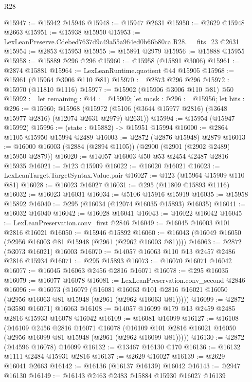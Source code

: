 \begin{lexlean}{R28}
\begin{coremodule}
@15947 := @15942 @15946
@15948 := @15947 @2631
@15950 := @2629 @15948 @2663
@15951 := @15938 @15950
@15953 := LexLeanPreserve.Cdebed7637d9c49a55a964ed0b66b80ca.R28.__fits_23 @2631
@15954 := @2853 @15953
@15955 := @15891 @2979
@15956 := @15888 @15955
@15958 := @15889 @296 @296
@15960 := @15958 (@15891 @3006)
@15961 := @2874 @15881
@15964 := LexLeanRuntime.quotient @44 @15905
@15968 := @15961 (@15964 @3006 @110 @81)
@15970 := @2873 @296 @296
@15972 := @15970 (@11810 @1116)
@15977 := @15902 (@15906 @3006 @110 @81) @50
@15992 := let remaining : @44 := @15909;
  let mask : @296 := @15956;
  let bits : @296 := @15960;
  @15968 (@15972 (@5106 (@3644 @15977 @2816) (@3648 @15977 @2816) (@12074 @2631 @2979) @2631))
@15994 := @15954 (@15947 @15992)
@15996 := (state : @15882) -> @15951 @15994
@16000 := @2864 @1105 @15950 @15994 @2489
@16003 := @2872 (@2876 @15948) @2879
@16013 := @16000 @16003 (@2884 (@2894 @1105)) (@2900 (@2901 (@2902 @2489) @15950 @2879))
@16020 := @14057 @16003 @50 @53 @2454 @2487 @2816 @15935
@16021 := @123 @15909
@16022 := @16020 @16021
@16023 := LexLeanTarget.TargetSyntax.Value.pair
@16027 := @123 (@15964 @15909 @110 @81)
@16028 := @16023 @16027
@16031 := @295 (@11809 @15893 @1116)
@16032 := @16023 @16031
@16034 := @5106 @15916 @15919
@16035 := @15958 @15892
@16040 := @295 (@16034 (@12074 @16035 @15893) @16035)
@16041 := @16032 @16040
@16042 := @16028 @16041
@16043 := @16022 @16042
@16045 := LexLeanPreservation.conv_first @2846
@16049 := @16045 @16003 @101 @2816 @16021
@16050 := @15946 @15892
@16060 := @16043 (@16049 @16050 (@2956 @16003 @81 @15948 (@2961 (@2962 @16003 @81))))
@16063 := @2872 (@3073 @16021) @16003
@16070 := @14057 @16063 @110 @13 @2457 @2486 @2816 @15934
@16071 := @295 @15893
@16073 := @16070 @16071 @16042
@16077 := @16045 @16063 @2456 @2816 @16071
@16078 := @295 @16035
@16079 := @16077 @16078
@16081 := LexLeanPreservation.conv_second @2846
@16096 := @16073
    (@16079
      (@16081 @16063 @101 @2816 @16021 @16050 (@2956 @16063 @81 @15948 (@2961 (@2962 @16063 @81)))))
@16099 := @2872 (@3580 @16071) @16063
@16108 := @14057 @16099 @179 @13 @2459 @2485 @2816 @15933 @16078 @16042
@16109 := @16081 @16099
@16127 := @16108
    (@16109
      @2456
      @2816
      @16071
      @16078
      (@16109 @101 @2816 @16021 @16050 (@2956 @16099 @81 @15948 (@2961 (@2962 @16099 @81)))))
@16130 := @2872 (@14596 @16078) @16099
@16132 := @13467 @16130 @170
@16136 := @16132 @1111 @2484 @15931 @2816
@16137 := @2629 @16027
@16139 := @2629 @16041 @2663
@16142 := @16136 (@16137 @16139) @16042
@16143 := @2947 @16130
@16149 := @16143 @2463 @2483 @15884 @15930 @16027 @16139

\end{coremodule}
\end{lexlean}
